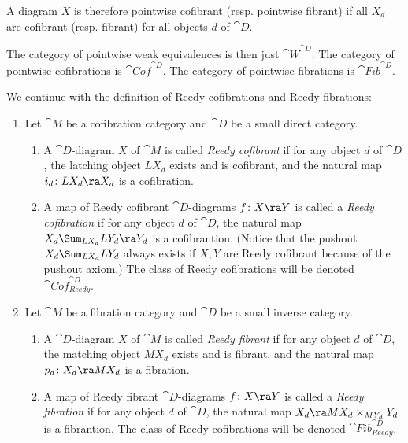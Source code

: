 A diagram $X$ is therefore pointwise cofibrant (resp. pointwise fibrant) if all $X_d$ are cofibrant (resp. fibrant) for all objects $d$ of ${\cat D}$.

The category of pointwise weak equivalences is then just ${\cat W}^{\cat D}$. The category of pointwise cofibrations is ${\cat Cof}^{\cat D}$. The category of pointwise fibrations is ${\cat Fib}^{\cat D}$.

We continue with the definition of Reedy cofibrations and Reedy fibrations:

\begin{defn}
\label{def:reedycof}
\mbox{}
\begin{enumerate}
\item
Let ${\cat M}$ be a cofibration category and ${\cat D}$ be a small direct category.
\begin{enumerate}
\item
A ${\cat D}$-diagram $X$ of ${\cat M}$ is called {\it Reedy cofibrant} if for any object $d$ of ${\cat D}$, the latching object $LX_d$ exists and is cofibrant, and the natural map $i_d \colon LX_d \ra X_d$ is a cofibration.
\item
A map of Reedy cofibrant ${\cat D}$-diagrams $f \colon X \ra Y$ is called a {\it Reedy cofibration} if for any object $d$ of ${\cat D}$, the natural map $X_d \Sum_{LX_d} LY_d \ra Y_d$ is a cofibrantion. (Notice that the pushout $X_d \Sum_{LX_d} LY_d$ always exists if $X, Y$ are Reedy cofibrant because of the pushout axiom.) The class of Reedy cofibrations will be denoted ${\cat Cof}^{\cat D}_{Reedy}$.
\end{enumerate}
\item
Let ${\cat M}$ be a fibration category and ${\cat D}$ be a small inverse category.
\begin{enumerate}
\item
A ${\cat D}$-diagram $X$ of ${\cat M}$ is called {\it Reedy fibrant} if for any object $d$ of ${\cat D}$, the matching object $MX_d$ exists and is fibrant, and the natural map $p_d \colon X_d \ra MX_d$ is a fibration.
\item
A map of Reedy fibrant ${\cat D}$-diagrams $f \colon X \ra Y$ is called a {\it Reedy fibration} if for any object $d$ of ${\cat D}$, the natural map $X_d \ra MX_d \times_{MY_d} Y_d$ is a fibrantion. The class of Reedy cofibrations will be denoted ${\cat Fib}^{\cat D}_{Reedy}$.
\end{enumerate}
\end{enumerate}
\end{defn}

